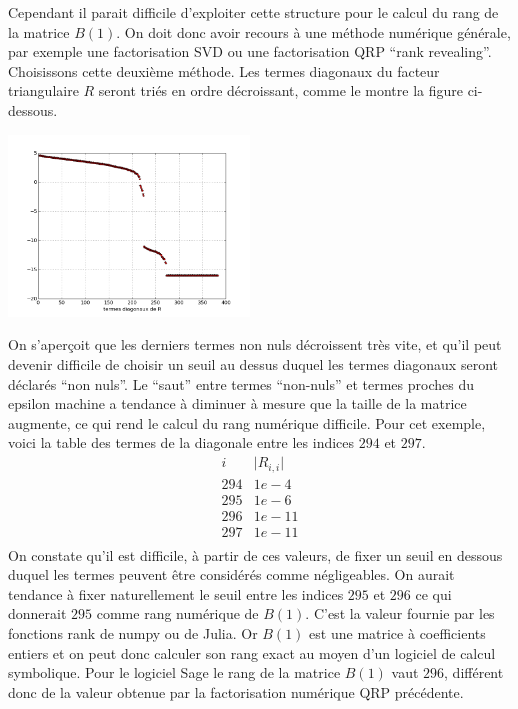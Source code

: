 \documentclass{standalone}
\begin{document}
Cependant il parait difficile d'exploiter cette structure pour le calcul du rang de la matrice $B(1)$. On doit donc avoir recours à une méthode numérique générale, par exemple une factorisation SVD ou une factorisation QRP ``rank revealing''. Choisissons cette deuxième méthode. Les termes diagonaux du facteur triangulaire $R$ seront triés en ordre décroissant, comme le montre la figure ci-dessous.
  \begin{center}
    \includegraphics[width=0.48\textwidth]{../png/diagR.png}
  \end{center}
 On s'aperçoit que les derniers termes non nuls décroissent très vite, et qu'il peut devenir difficile de choisir un seuil au dessus duquel les termes diagonaux seront déclarés ``non nuls''. Le ``saut'' entre termes ``non-nuls'' et termes proches du epsilon machine a tendance à diminuer à mesure que la taille de la matrice augmente, ce qui rend le calcul du rang numérique difficile. Pour cet exemple, voici la table des termes de la diagonale entre les indices $294$ et $297$.
 $$
 \begin{array}{c|c}
 	i & \vert R_{i,i}\vert \\
 	\hline
 	294  & 1e-4 \\
 	295 & 1e-6 \\
 	296 & 1e-11 \\
 	297 & 1e-11 \\
 \end{array}
 $$
On constate qu'il est difficile, à partir de ces valeurs, de fixer un seuil en dessous duquel les termes peuvent être considérés comme négligeables. On aurait tendance à fixer naturellement le seuil entre les indices $295$ et $296$ ce qui donnerait $295$ comme rang numérique de $B(1)$. C'est la valeur fournie par les fonctions rank de numpy ou de Julia. Or $B(1)$ est une matrice à coefficients entiers et on peut donc calculer son rang exact au moyen d'un logiciel de calcul symbolique. Pour le logiciel Sage le rang de la matrice $B(1)$ vaut $296$, différent donc de la valeur obtenue par la factorisation numérique QRP précédente.
\end{document}

